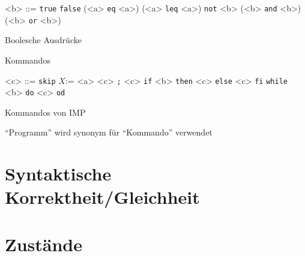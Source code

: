 \begin{description}[leftmargin = 2cm]
			    	\begin{description}[leftmargin = 3cm]
			    		\item[Definition:]
				    		\begin{grammar}
					    		<b> ::= \texttt{true}
						    		\alt \texttt{false}
						    		\alt (<a> \texttt{eq} <a>)
						    		\alt (<a> \texttt{leq} <a>)
						    		\alt \texttt{not} <b>
						    		\alt (<b> \texttt{and} <b>)
						    		\alt (<b> \texttt{or} <b>)
				    		\end{grammar}
			    		\item[Intuition:] Boolesche Ausdrücke
			    	\end{description}
		    	\item[\textit{Com}] Kommandos
			    	\begin{description}[leftmargin = 3cm]
			    		\item[Definition:]
				    		\begin{grammar}
						    	<c> ::= \texttt{skip}
							    	\alt $ X \texttt {:=} $ <a>
							    	\alt <c> \texttt{;} <c>
							    	\alt \texttt{if} <b> \texttt{then} <c> \texttt{else} <c> \texttt{fi}
							    	\alt \texttt{while} <b> \texttt{do} <c> \texttt{od}
				    		\end{grammar}
			    		\item[Intuition:] Kommandos von IMP
			    		\item[Konvention:] \enquote{Programm} wird synonym für \enquote{Kommando} verwendet
			    	\end{description}
		    \end{description}
    
    \section{Syntaktische Korrektheit/Gleichheit}
	    
    
    \section{Zustände}
	    
